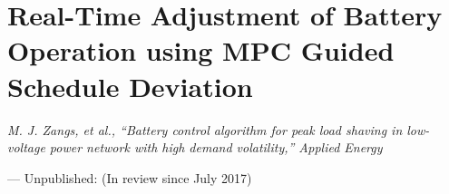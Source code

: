\chapter{Real-Time Adjustment of Battery Operation using MPC Guided Schedule Deviation}
\label{ch2}

\singlespacing
\epigraph{\textit{M. J. Zangs, et al., ``Battery control algorithm for peak load shaving in low-voltage power network with high demand volatility,'' Applied Energy}}{--- Unpublished: (In review since July 2017)}
\doublespacing












